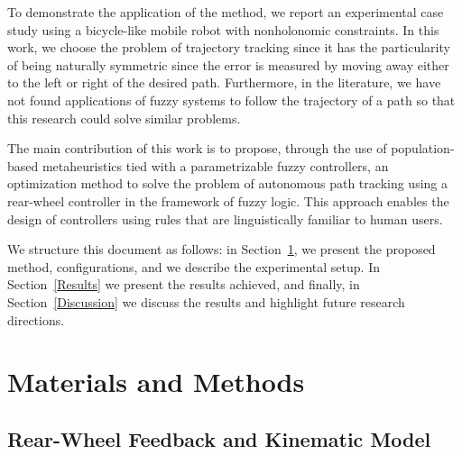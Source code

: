 \documentclass[symmetry,article,submit,moreauthors,pdftex]{Definitions/mdpi}
\begin{document}
To demonstrate the application of the method, we report an experimental case
study using a bicycle-like mobile robot with nonholonomic constraints.  In this
work, we choose the problem of trajectory tracking since it has the
particularity of being naturally symmetric since the error is measured by
moving away either to the left or right of the desired path. Furthermore, in
the literature, we have not found applications of fuzzy systems to follow the
trajectory of a path so that this research could solve similar problems.

The main contribution of this work is to propose, through the use of
population-based metaheuristics tied with a parametrizable fuzzy controllers,
an optimization method to solve the problem of autonomous path tracking using a
rear-wheel controller in the framework of fuzzy logic. This approach enables
the design of controllers using rules that are linguistically familiar to human
users.

We structure this document as follows: in Section~\ref{MatAndMethods}, we
present the proposed method, configurations, and we describe the experimental
setup. In Section~\ref{Results} we present the results achieved, and finally,
in Section~\ref{Discussion} we discuss the results and highlight future
research directions.

 
\section{Materials and Methods}\label{MatAndMethods}

\subsection{Rear-Wheel Feedback and Kinematic Model}\label{sec:kinematic}
\end{document}
